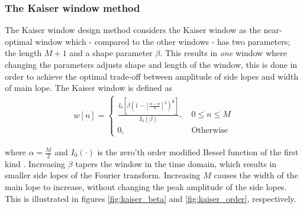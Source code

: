 \subsubsection{The Kaiser window method}
The Kaiser window design method considers the Kaiser window as the near-optimal window which - compared to the other windows - has two parameters; the length $M+1$ and a shape parameter $\beta$. This results in \textit{one} window where changing the parameters adjusts shape and length of the window, this is done in order to achieve the optimal trade-off between amplitude of side lopes and width of main lope. The Kaiser window is defined as 
\begin{align}
w[n]=\left\{\begin{matrix}
 \frac{I_0[\beta (1-[\frac{n-\alpha}{\alpha}]^2)^{\frac{1}{2}}]}{I_0(\beta)} , &\ 0 \leq n \leq M  \\ 
0, &\ \text{Otherwise}
\end{matrix}\right.
\end{align}

where $\alpha=\frac{M}{2}$ and $I_0(\cdot)$ is the zero'th order modified Bessel function of the first kind \cite{DTSP, page 474-476}. Increasing $\beta$ tapers the window in the time domain, which results in smaller side lopes of the Fourier transform. Increasing $M$ causes the width of the main lope to increase, without changing the peak amplitude of the side lopes. This is illustrated in figures \ref{fig:kaiser_beta} and \ref{fig:kaiser_order}, respectively.\\


